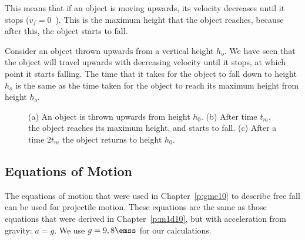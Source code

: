 This means that if an object is moving upwards, its velocity decreases until it stops ($v_f=0$~\ms). This is the maximum height that the object reaches, because after this, the object starts to fall.


\pagebreak[4]
Consider an object thrown upwards from a vertical height $h_o$. We have seen that the object will travel upwards with decreasing velocity until it stops, at which point it starts falling. The time that it takes for the object to fall down to height $h_o$ is the same as the time taken for the object to reach its maximum height from height $h_o$.

\begin{figure}[htbp]
\begin{center}
\caption{(a) An object is thrown upwards from height $h_0$. (b) After time $t_m$, the object reaches its maximum height, and starts to fall. (c) After a time $2t_m$ the object returns to height $h_0$.}
\label{fig:p:m:m2d12:maxheighttime}
\end{center}
\end{figure}


\subsection{Equations of Motion}
The equations of motion that were used in Chapter~\ref{p:gme10} to describe free fall can be used for projectile motion. These equations are the same as those equations that were derived in Chapter~\ref{p:m1d10}, but with acceleration from gravity: $a=g$. We use $g=9,8\emss$ for our calculations. 

